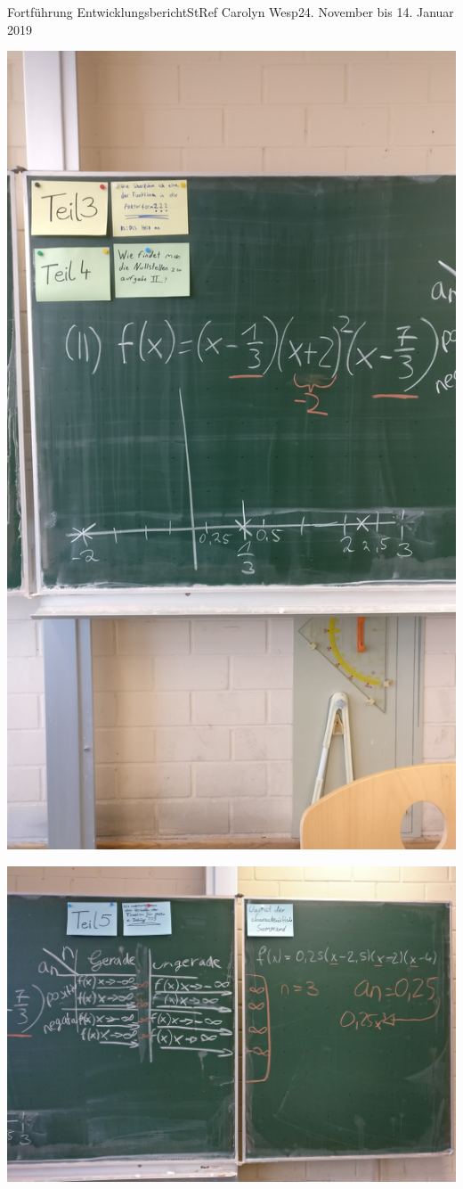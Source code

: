 \documentclass[oneside,openany,headings=optiontotoc,11pt,numbers=noenddot]{article}
\begin{document}
\begin{worksheet}{Fortführung Entwicklungsbericht}{StRef\grq{} Carolyn Wesp}{24. November bis 14. Januar 2019}
\begin{minipage}{0.48\textwidth}
			\includegraphics[width=\textwidth]{../Faktorform_2.jpg}
		\end{minipage}
		\newpage
		\includegraphics[width=\textwidth]{../Faktorform_3.jpg}
	\end{worksheet}	
\end{document}
